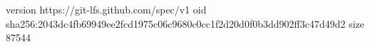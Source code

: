 version https://git-lfs.github.com/spec/v1
oid sha256:2043dc4fb69949ee2fcd1975c06c9680c0cc1f2d20d0f0b3dd902ff3c47d49d2
size 87544
